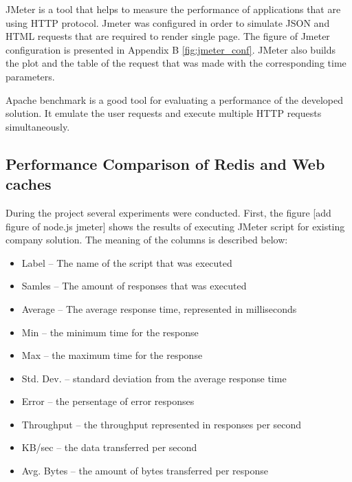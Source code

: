 JMeter is a tool that helps to measure the performance of applications that are using HTTP protocol. Jmeter was configured in order to simulate JSON and HTML requests that are required to render single page. The figure of Jmeter configuration is presented in Appendix B \ref{fig:jmeter_conf}. 
JMeter also builds the plot and the table of the request that was made with the corresponding time parameters.

Apache benchmark is a good tool for evaluating a performance of the developed solution. It emulate the user requests and execute multiple HTTP requests simultaneously.   

\subsection{Performance Comparison of Redis and Web caches}


During the project several experiments were conducted. First, the figure [add figure of node.js jmeter] shows the results of executing JMeter script for existing company solution. The meaning of the columns is described below: 

\begin{itemize}
	\item Label  -- The name of the script that was executed
	\item Samles -- The amount of responses that was executed
	\item Average -- The average response time, represented in milliseconds
	\item Min -- the minimum time for the response 
	\item Max -- the maximum time for the response
	\item Std. Dev.  -- standard deviation from the average response time
	\item Error -- the persentage of error responses
	\item Throughput -- the throughput represented in responses per second
	\item KB/sec -- the data transferred per second
	\item Avg. Bytes -- the amount of bytes transferred per response
\end{itemize}


\newpage
